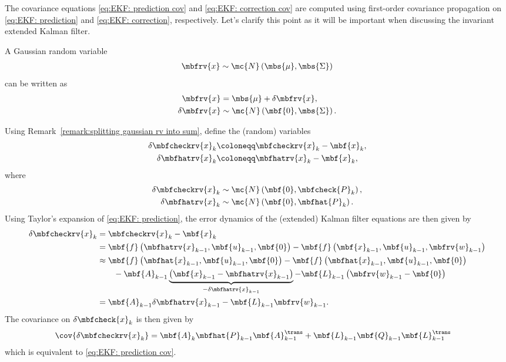 \documentclass[nobib, nofonts, notoc, justified]{tufte-handout}
\begin{document}
  The covariance equations \eqref{eq:EKF: prediction cov} and \eqref{eq:EKF: correction cov} are computed using first-order covariance propagation on \eqref{eq:EKF: prediction} and \eqref{eq:EKF: correction}, respectively. Let's clarify this point as it will be important when discussing the invariant extended Kalman filter.

  \begin{remark}  
    \label{remark:splitting gaussian rv into sum}
    A Gaussian random variable 
    \begin{align}
      \mbfrv{x}\sim\mc{N}\left( \mbs{\mu}, \mbs{\Sigma} \right)
    \end{align}
    can be written as
    \begin{align}
      \mbfrv{x} &= \mbs{\mu} + \delta\mbfrv{x},\\
      \delta\mbfrv{x} &\sim \mc{N}\left( \mbf{0}, \mbs{\Sigma} \right).
    \end{align}
  \end{remark}
  Using Remark~\ref{remark:splitting gaussian rv into sum}, define the (random) variables
  \begin{align}
    \label{eq:KF: prediction err. def.}
    \delta\mbfcheckrv{x}_{k} &\coloneqq \mbfcheckrv{x}_{k} -  \mbf{x}_{k},\\
    \label{eq:KF: correction err. def.}
    \delta\mbfhatrv{x}_{k} &\coloneqq \mbfhatrv{x}_{k} -  \mbf{x}_{k},
  \end{align}
  where
  \begin{align}
    \delta\mbfcheckrv{x}_{k} &\sim\mc{N}\left( \mbf{0}, \mbfcheck{P}_{k} \right),\\
    \delta\mbfhatrv{x}_{k} &\sim\mc{N}\left( \mbf{0}, \mbfhat{P}_{k} \right).
  \end{align}
  Using Taylor's expansion of \eqref{eq:EKF: prediction}, the error dynamics of the (extended) Kalman filter equations are then given by
  \begin{align}
    \delta\mbfcheckrv{x}_{k} 
    &= \mbfcheckrv{x}_{k} - \mbf{x}_{k} \\
    &= \mbf{f}\left( \mbfhatrv{x}_{k-1}, \mbf{u}_{k-1}, \mbf{0} \right) - \mbf{f}\left( \mbf{x}_{k-1}, \mbf{u}_{k-1}, \mbfrv{w}_{k-1} \right)\\
    &\approx \mbf{f}\left( \mbfhat{x}_{k-1}, \mbf{u}_{k-1}, \mbf{0} \right) - \mbf{f}\left( \mbfhat{x}_{k-1},\mbf{u}_{k-1}, \mbf{0} \right) 
      \nonumber\\&\qquad
      - \mbf{A}_{k-1}\underbrace{\left( \mbf{x}_{k-1} - \mbfhatrv{x}_{k-1} \right)}_{-\delta\mbfhatrv{x}_{k-1}} - \mbf{L}_{k-1}\left( \mbfrv{w}_{k-1} - \mbf{0} \right)\\
    &= \mbf{A}_{k-1}\delta\mbfhatrv{x}_{k-1} - \mbf{L}_{k-1}\mbfrv{w}_{k-1}.
  \end{align}
  The covariance on $\delta\mbfcheck{x}_{k}$ is then given by
  \begin{align}
    \cov{\delta\mbfcheckrv{x}_{k}} &= \mbf{A}_{k}\mbfhat{P}_{k-1}\mbf{A}_{k-1}^{\trans} + \mbf{L}_{k-1}\mbf{Q}_{k-1}\mbf{L}_{k-1}^{\trans}
  \end{align}
  which is equivalent to \eqref{eq:EKF: prediction cov}.
\end{document}
